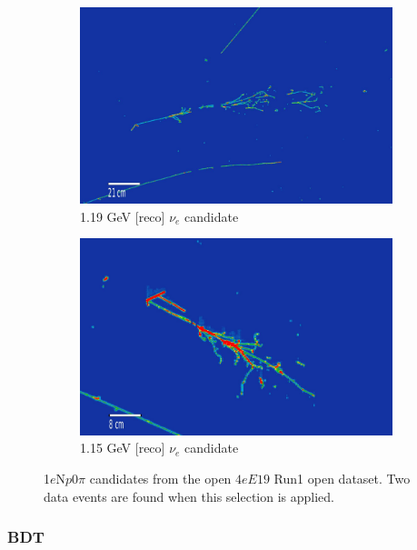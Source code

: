 \documentclass[a4paper]{article}
\newcommand{\npsel}{1$e$N$p$0$\pi$ }
\begin{document}
\begin{figure}[H] 
\begin{center}
    \begin{subfigure}[b]{0.45\textwidth}
    \centering
    \includegraphics[width=1.00\textwidth]{1eNp/1eNp_box_evd1.png}
    \caption{\label{fig:1eNp:box:evd1}1.19 GeV [reco] $\nu_e$ candidate}
    \end{subfigure}
    \begin{subfigure}[b]{0.45\textwidth}
    \centering
    \includegraphics[width=1.00\textwidth]{1eNp/1eNp_box_evd2.png}
    \caption{\label{fig:1eNp:box:evd2}1.15 GeV [reco] $\nu_e$ candidate}
    \end{subfigure}
\caption{\label{ffig:1eNp:box:evd} \npsel candidates from the open $4eE19$ Run1 open dataset. Two data events are found when this selection is applied.}
\end{center}
\end{figure}

\subsubsection{BDT}
\end{document}
